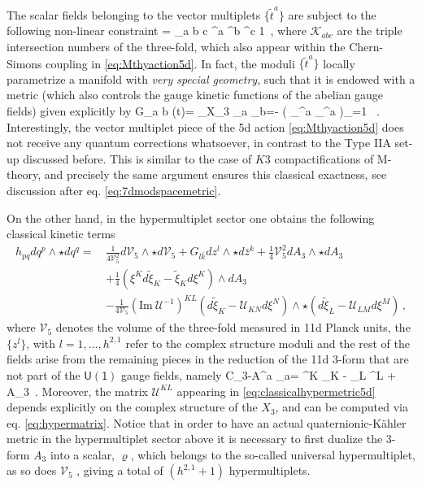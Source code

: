 The scalar fields belonging to the vector multiplets $\{ \tilde{t}^a\}$ are subject to the following non-linear constraint
%
\beq\label{eq:veryspecialgeometry}
	= _{a b c} ^a ^b ^c \stackrel{!}{=} 1\, ,
\eeq
%
where $\mathcal{K}_{a b c}$ are the triple intersection numbers of the three-fold, which also appear within the Chern-Simons coupling in \eqref{eq:Mthyaction5d}. In fact, the moduli $\{ \tilde{t}^a\}$ locally parametrize a manifold with \emph{very special geometry}, such that it is endowed with a metric (which also controls the gauge kinetic functions of the abelian gauge fields) given explicitly by
%
\beq\label{eq:5dVMmetric}
	G_{a b} (\tilde t)= \int_{X_3} \omega_a \wedge \star \omega_b=-  \left( \partial_{^a} \partial_{^a} \log {}\right)\bigg\rvert_{=1} \, .
\eeq
%
Interestingly, the vector multiplet piece of the 5d action \eqref{eq:Mthyaction5d} does not receive any quantum corrections whatsoever, in contrast to the Type IIA set-up discussed before. This is similar to the case of $K3$ compactifications of M-theory, and precisely the same argument ensures this classical exactness, see discussion after eq. \eqref{eq:7dmodspacemetric}.
		
On the other hand, in the hypermultiplet sector one obtains the following classical kinetic terms
%
\begin{align}\label{eq:classicalhypermetric5d}
		\nonumber h_{pq} dq^p \wedge \star dq^q =\, &\frac{1}{4\mathcal{V}_5^2}d\mathcal{V}_5\wedge \star d\mathcal{V}_5 + G_{l \bar{k}} dz^l \wedge \star d\bar z^k + \frac{1}{4} \mathcal{V}_5^2 dA_3\wedge \star dA_3 \\
		\nonumber&+ \frac{1}{4}\left(\xi^K d \tilde{\xi}_K- \tilde{\xi}_K d \xi^K\right) \wedge dA_3 \\
		&-\frac{1}{4\mathcal{V}_5} (\text{Im}\ \mathcal{U}^{-1})^{KL} \left(d \tilde{\xi}_K-\mathcal{U}_{KN}d \xi^N  \right)\wedge \star \left(d \tilde{\xi}_L-\mathcal{U}_{LM}d \xi^M  \right)\, ,
\end{align}
%
where $\mathcal{V}_5$ denotes the volume of the three-fold measured in 11d Planck units, the $\{z^l\}$, with $l=1, \ldots, h^{2,1}$ refer to the complex structure moduli and the rest of the fields arise from the remaining pieces in the reduction of the 11d 3-form that are not part of the $\mathsf{U(1)}$ gauge fields, namely
%
\beq \label{eq:3-formexpansion}
	C_3-A^a \wedge \omega_a= \xi^K \alpha_K - \tilde{\xi}_L \beta^L + A_3\, .
\eeq
%
Moreover, the matrix $\mathcal{U}^{KL}$ appearing in \eqref{eq:classicalhypermetric5d} depends explicitly on the complex structure of the $X_3$, and can be computed via eq. \eqref{eq:hypermatrix}. Notice that in order to have an actual quaternionic-K\"ahler metric in the hypermultiplet sector above it is necessary to first dualize the 3-form $A_3$ into a scalar, $\varrho$, which belongs to the so-called universal hypermultiplet, as so does $\mathcal{V}_5$ \cite{Cadavid:1995bk}, giving a total of $(h^{2,1}+1)$ hypermultiplets.

